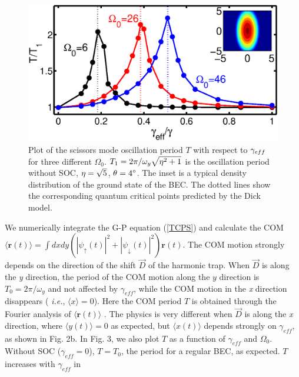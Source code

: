 \documentclass[prl,twocolumn,superscriptaddress,showpacs,floatfix]{revtex4}
\begin{document}
\begin{figure}[b]
\includegraphics[width=1\linewidth]{Fig4.eps}
\caption{Plot of the scissors mode oscillation period $T$ with respect to $%
\protect\gamma _{eff}$ for three different $\Omega _{0}$. $T_{1}=2\protect%
\pi /\protect\omega _{y}\protect\sqrt{\protect\eta ^{2}+1}$ is the
oscillation period without SOC, $\protect\eta =\protect\sqrt{5}$, $\protect%
\theta =4^{\circ }$. The inset is a typical density distribution of the
ground state of the BEC. The dotted lines show the corresponding quantum
critical points predicted by the Dick model. }
\label{scissormode}
\end{figure}
We numerically integrate the G-P equation (\ref{TCPS}) and calculate the COM
$\langle \mathbf{r}(t)\rangle =\int dxdy(|\psi _{\uparrow }(t)|^{2}+|\psi
_{\downarrow }(t)|^{2})\mathbf{r}\left( t\right) $. The COM motion strongly
depends on the direction of the shift $\vec{D}$ of the harmonic trap. When $%
\vec{D}$ is along the \textit{y} direction, the period of the COM motion
along the $y$ direction is $T_{0}=2\pi /\omega _{y}$ and not affected by $%
\gamma _{eff}$, while the COM motion in the \textit{x} direction disappears (%
\textit{i.e.}, $\langle x\rangle =0$). Here the COM period $T$ is obtained
through the Fourier analysis of $\langle \mathbf{r}\left( t\right) \rangle $%
. The physics is very different when $\vec{D}$ is along the \textit{x}
direction, where $\langle y\left( t\right) \rangle =0$ as expected, but $%
\langle x\left( t\right) \rangle $ depends strongly on $\gamma _{eff}$, as
shown in Fig. 2b. In Fig. 3, we also plot $T$ as a function of $\gamma
_{eff} $ and $\Omega _{0}$. Without SOC ($\gamma _{eff}=0$), $T=T_{0}$, the
period for a regular BEC, as expected. $T$ increases with $\gamma _{eff}$ in
\end{document}
